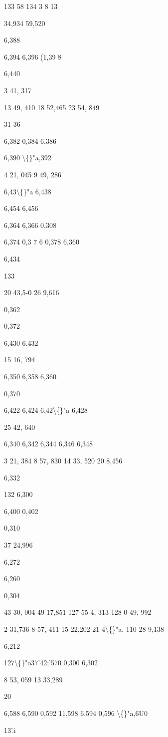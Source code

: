 \documentclass[10pt,a4paper]{article}
\begin{document}
133 58
134 3
8
13

34,934
59,520

6,388

6,394
6,396
(1,39 8

6,440

3 41, 317

13 49, 410
18 52,465
23 54, 849

31
36

6,382
0,384
6,386

6,390
\textbackslash\{\}"a,392

4 21, 045
9 49, 286

6,43\textbackslash\{\}"a
6,438

6,454
6,456

6,364
6,366
0,308

6,374
0,3 7 6
0,378
6,360

6,434

133

20 43,5-0
26
9,616

0,362

0,372

6,430
6.432

15 16, 794

6,350
6,358
6,360

0,370

6,422
6,424
6,42\textbackslash\{\}"a
6,428

25 42, 640

6,340
6,342
6,344
6,346
6,348

3 21, 384
8 57, 830
14 33, 520
20
8,456

6,332

132
6,300

6,400
0,402

0,310

37 24,996

6,272

6,260

0,304

43 30, 004
49 17,851
127 55
4, 313
128 0 49, 992

2 31,736
8 57, 411
15 22,202
21 4\textbackslash\{\}"a, 110
28
9,138

6,212

127\textbackslash\{\}"o37'42;'570
0,300
6,302

8 53, 059
13 33,289

20

6,588
6,590
0,592
11,598
6,594
0,596
\textbackslash\{\}"a,6U0

13'.i
\end{document}
